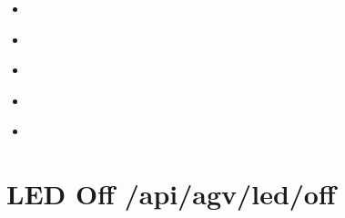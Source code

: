 \documentclass[letterpaper,10pt,english]{sphinxmanual}
\begin{document}
\sphinxAtStartPar
{}
\begin{itemize}
\item {} 
\sphinxAtStartPar
{\hyperref[\detokenize{agv_rest_api_led:get-api-agv-led-off}]{}}

\item {} 
\sphinxAtStartPar
{\hyperref[\detokenize{agv_rest_api_led:post-api-agv-led-on}]{}}

\item {} 
\sphinxAtStartPar
{\hyperref[\detokenize{agv_rest_api_led:post-api-agv-led-flashonce}]{}}

\item {} 
\sphinxAtStartPar
{\hyperref[\detokenize{agv_rest_api_led:post-api-agv-led-flashinfinite}]{}}

\item {} 
\sphinxAtStartPar
{\hyperref[\detokenize{agv_rest_api_led:post-api-agv-led-flashntimes}]{}}

\end{itemize}


\section{LED Off \textendash{} /api/agv/led/off}
\label{\detokenize{agv_rest_api_led:led-off-api-agv-led-off}}\label{\detokenize{agv_rest_api_led:get-api-agv-led-off}}
\end{document}
